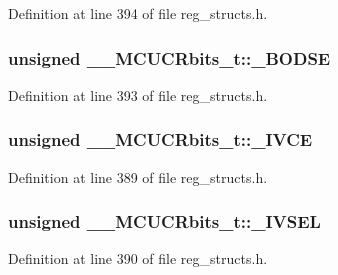 Definition at line 394 of file reg\+\_\+structs.\+h.

\hypertarget{union_____m_c_u_c_rbits__t_a9f388d48bbe156de9bfce2bf227faf4a}{
\subsubsection[{\+\_\+\+B\+O\+D\+S\+E}]{\setlength{\rightskip}{0pt plus 5cm}unsigned \+\_\+\+\_\+\+M\+C\+U\+C\+Rbits\+\_\+t\+::\+\_\+\+B\+O\+D\+S\+E}}\label{union_____m_c_u_c_rbits__t_a9f388d48bbe156de9bfce2bf227faf4a}


Definition at line 393 of file reg\+\_\+structs.\+h.

\hypertarget{union_____m_c_u_c_rbits__t_af353179edf7c94bff0975a8e112d0b83}{
\subsubsection[{\+\_\+\+I\+V\+C\+E}]{\setlength{\rightskip}{0pt plus 5cm}unsigned \+\_\+\+\_\+\+M\+C\+U\+C\+Rbits\+\_\+t\+::\+\_\+\+I\+V\+C\+E}}\label{union_____m_c_u_c_rbits__t_af353179edf7c94bff0975a8e112d0b83}


Definition at line 389 of file reg\+\_\+structs.\+h.

\hypertarget{union_____m_c_u_c_rbits__t_a53246060aa2bbc0beeb32faf89fba540}{
\subsubsection[{\+\_\+\+I\+V\+S\+E\+L}]{\setlength{\rightskip}{0pt plus 5cm}unsigned \+\_\+\+\_\+\+M\+C\+U\+C\+Rbits\+\_\+t\+::\+\_\+\+I\+V\+S\+E\+L}}\label{union_____m_c_u_c_rbits__t_a53246060aa2bbc0beeb32faf89fba540}


Definition at line 390 of file reg\+\_\+structs.\+h.

